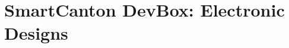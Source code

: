 
\appendixpagenumbering %

\chapter{SmartCanton DevBox: Electronic Designs} %

\label{AppendixDevBoxHardware} %



